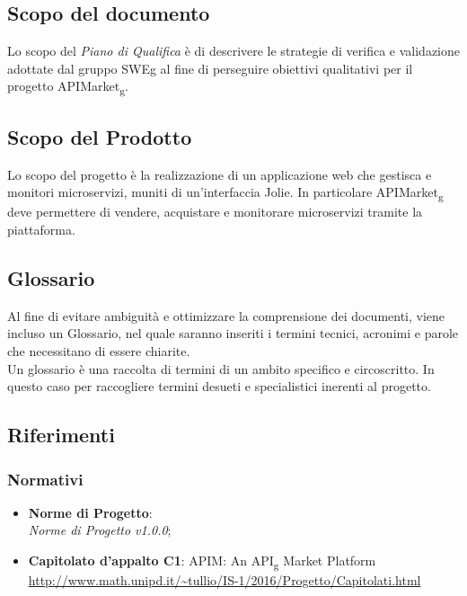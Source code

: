 \documentclass[12pt,a4paper,titlepage]{article}
\begin{document}
	\subsection{Scopo del documento}
	Lo scopo del \textit{Piano di Qualifica} è di descrivere le strategie di verifica e validazione adottate dal gruppo SWEg al fine di perseguire obiettivi qualitativi per il progetto APIMarket\textsubscript{g}.
	
	\subsection{Scopo del Prodotto}
	Lo scopo del progetto è la realizzazione di un applicazione web che gestisca e monitori microservizi, muniti di un'interfaccia Jolie. In particolare APIMarket\textsubscript{g} deve permettere di vendere, acquistare e monitorare microservizi tramite la piattaforma.
	
	\subsection{Glossario}
	Al fine di evitare ambiguità e ottimizzare la comprensione dei documenti, viene incluso un Glossario, nel quale saranno inseriti i termini tecnici, acronimi e parole che necessitano di essere chiarite.\\
	Un glossario è una raccolta di termini di un ambito specifico e circoscritto. In questo caso per raccogliere termini desueti e specialistici inerenti al progetto.
	
	\subsection{Riferimenti}
	\subsubsection{Normativi}
	\begin{itemize}
		\item \textbf{Norme di Progetto}:\\
		\textit{Norme di Progetto v1.0.0};
		\item \textbf{Capitolato d'appalto C1}: APIM: An API\textsubscript{g} Market Platform\\
			\textcolor{blue}{\url{http://www.math.unipd.it/~tullio/IS-1/2016/Progetto/Capitolati.html}}
	\end{itemize}
\end{document}
